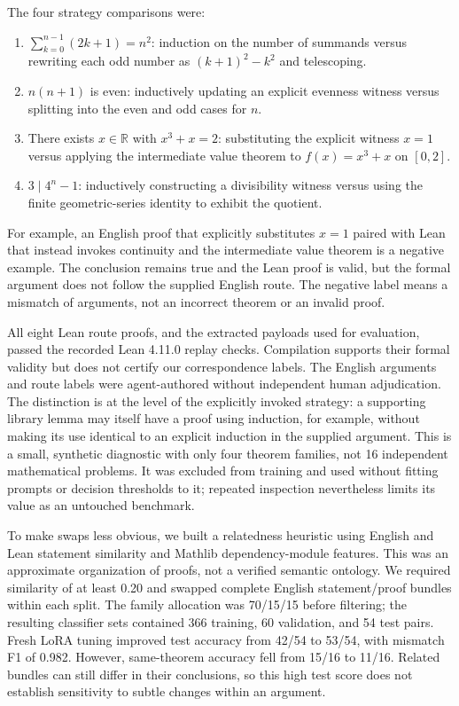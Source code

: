 \documentclass[sigconf,nonacm]{acmart}
\begin{document}
The four strategy comparisons were:
\begin{enumerate}
\item $\sum_{k=0}^{n-1}(2k+1)=n^2$: induction on the number of summands versus rewriting each odd number as $(k+1)^2-k^2$ and telescoping.
\item $n(n+1)$ is even: inductively updating an explicit evenness witness versus splitting into the even and odd cases for $n$.
\item There exists $x\in\mathbb{R}$ with $x^3+x=2$: substituting the explicit witness $x=1$ versus applying the intermediate value theorem to $f(x)=x^3+x$ on $[0,2]$.
\item $3\mid 4^n-1$: inductively constructing a divisibility witness versus using the finite geometric-series identity to exhibit the quotient.
\end{enumerate}

For example, an English proof that explicitly substitutes $x=1$ paired with Lean that instead invokes continuity and the intermediate value theorem is a negative example. The conclusion remains true and the Lean proof is valid, but the formal argument does not follow the supplied English route. The negative label means a mismatch of arguments, not an incorrect theorem or an invalid proof.

All eight Lean route proofs, and the extracted payloads used for evaluation, passed the recorded Lean 4.11.0 replay checks. Compilation supports their formal validity but does not certify our correspondence labels. The English arguments and route labels were agent-authored without independent human adjudication. The distinction is at the level of the explicitly invoked strategy: a supporting library lemma may itself have a proof using induction, for example, without making its use identical to an explicit induction in the supplied argument. This is a small, synthetic diagnostic with only four theorem families, not 16 independent mathematical problems. It was excluded from training and used without fitting prompts or decision thresholds to it; repeated inspection nevertheless limits its value as an untouched benchmark.

To make swaps less obvious, we built a relatedness heuristic using English and Lean statement similarity and Mathlib dependency-module features. This was an approximate organization of proofs, not a verified semantic ontology. We required similarity of at least 0.20 and swapped complete English statement/proof bundles within each split. The family allocation was 70/15/15 before filtering; the resulting classifier sets contained 366 training, 60 validation, and 54 test pairs. Fresh LoRA tuning improved test accuracy from 42/54 to 53/54, with mismatch F1 of 0.982. However, same-theorem accuracy fell from 15/16 to 11/16. Related bundles can still differ in their conclusions, so this high test score does not establish sensitivity to subtle changes within an argument.
\end{document}
